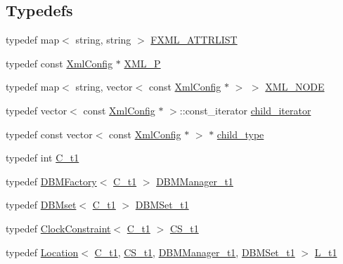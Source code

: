\subsection*{Typedefs}
\begin{DoxyCompactItemize}
\item 
typedef map$<$ string, string $>$ \mbox{\hyperlink{namespacegraphsat_ab40f1a7cacbf704e1869c944a7893ccc}{F\+X\+M\+L\+\_\+\+A\+T\+T\+R\+L\+I\+ST}}
\item 
typedef const \mbox{\hyperlink{classgraphsat_1_1_xml_config}{Xml\+Config}} $\ast$ \mbox{\hyperlink{namespacegraphsat_a94de7ec8ce4b5d6bc48bdc19e58b2d76}{X\+M\+L\+\_\+P}}
\item 
typedef map$<$ string, vector$<$ const \mbox{\hyperlink{classgraphsat_1_1_xml_config}{Xml\+Config}} $\ast$ $>$ $>$ \mbox{\hyperlink{namespacegraphsat_a8b991d53e7169027cb0197e267a5915b}{X\+M\+L\+\_\+\+N\+O\+DE}}
\item 
typedef vector$<$ const \mbox{\hyperlink{classgraphsat_1_1_xml_config}{Xml\+Config}} $\ast$ $>$\+::const\+\_\+iterator \mbox{\hyperlink{namespacegraphsat_af6dd75b1115bf1e0c83a8c0284d39f91}{child\+\_\+iterator}}
\item 
typedef const vector$<$ const \mbox{\hyperlink{classgraphsat_1_1_xml_config}{Xml\+Config}} $\ast$ $>$ $\ast$ \mbox{\hyperlink{namespacegraphsat_aba2f5cf076d49898cc0469bee94d3a05}{child\+\_\+type}}
\item 
typedef int \mbox{\hyperlink{namespacegraphsat_af82e57b58a5af8441762469b70c475da}{C\+\_\+t1}}
\item 
typedef \mbox{\hyperlink{classgraphsat_1_1_d_b_m_factory}{D\+B\+M\+Factory}}$<$ \mbox{\hyperlink{namespacegraphsat_af82e57b58a5af8441762469b70c475da}{C\+\_\+t1}} $>$ \mbox{\hyperlink{namespacegraphsat_abe6691ac6002381e0250076f52d17b09}{D\+B\+M\+Manager\+\_\+t1}}
\item 
typedef \mbox{\hyperlink{classgraphsat_1_1_d_b_mset}{D\+B\+Mset}}$<$ \mbox{\hyperlink{namespacegraphsat_af82e57b58a5af8441762469b70c475da}{C\+\_\+t1}} $>$ \mbox{\hyperlink{namespacegraphsat_aef99081ea3cfd071bce1daf003acde8d}{D\+B\+M\+Set\+\_\+t1}}
\item 
typedef \mbox{\hyperlink{classgraphsat_1_1_clock_constraint}{Clock\+Constraint}}$<$ \mbox{\hyperlink{namespacegraphsat_af82e57b58a5af8441762469b70c475da}{C\+\_\+t1}} $>$ \mbox{\hyperlink{namespacegraphsat_a6a55464bf94f0ab98539fd8c3b66c603}{C\+S\+\_\+t1}}
\item 
typedef \mbox{\hyperlink{classgraphsat_1_1_location}{Location}}$<$ \mbox{\hyperlink{namespacegraphsat_af82e57b58a5af8441762469b70c475da}{C\+\_\+t1}}, \mbox{\hyperlink{namespacegraphsat_a6a55464bf94f0ab98539fd8c3b66c603}{C\+S\+\_\+t1}}, \mbox{\hyperlink{namespacegraphsat_abe6691ac6002381e0250076f52d17b09}{D\+B\+M\+Manager\+\_\+t1}}, \mbox{\hyperlink{namespacegraphsat_aef99081ea3cfd071bce1daf003acde8d}{D\+B\+M\+Set\+\_\+t1}} $>$ \mbox{\hyperlink{namespacegraphsat_a73a6ad304c41491a8939153273e88398}{L\+\_\+t1}}

\end{DoxyCompactItemize}
